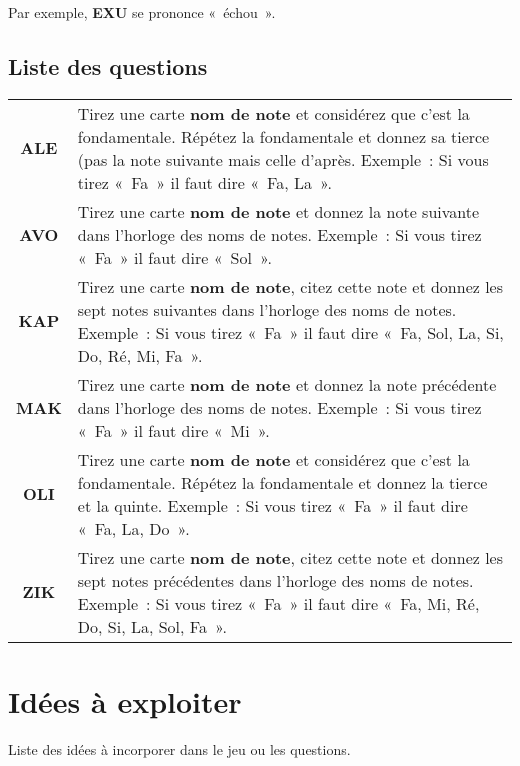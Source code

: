 \documentclass[11pt]{article}
\newcommand{\carte}[1]
{\textbf{#1}}
\newcommand{\QST}[1]
{\textbf{#1}}
\begin{document}
Par exemple, \QST{EXU} se prononce « échou ».

\subsection{Liste des questions} \label{liste questions}

\begin{tabular}{ c p{12cm} }
    \QST{ALE} & Tirez une carte \carte{nom de note} et considérez que c’est la
                fondamentale. Répétez la fondamentale et donnez sa tierce (pas
                la note suivante mais celle d’après. Exemple : Si vous tirez
                « Fa » il faut dire « Fa, La ». \\
    \QST{AVO} & Tirez une carte \carte{nom de note} et donnez la note suivante
                dans l’horloge des noms de notes. Exemple : Si vous tirez
                « Fa » il faut dire « Sol ». \\
    \QST{KAP} & Tirez une carte \carte{nom de note}, citez cette note et donnez
                les sept notes suivantes dans l’horloge des noms de notes.
                Exemple : Si vous tirez « Fa » il faut dire « Fa, Sol, La, Si,
                Do, Ré, Mi, Fa ». \\
    \QST{MAK} & Tirez une carte \carte{nom de note} et donnez la note
                précédente dans l’horloge des noms de notes. Exemple : Si vous
                tirez « Fa » il faut dire « Mi ». \\
    \QST{OLI} & Tirez une carte \carte{nom de note} et considérez que c’est la
                fondamentale. Répétez la fondamentale et donnez la tierce et
                la quinte. Exemple : Si vous tirez « Fa » il faut dire « Fa,
                La, Do ». \\
    \QST{ZIK} & Tirez une carte \carte{nom de note}, citez cette note et donnez
                les sept notes précédentes dans l’horloge des noms de notes.
                Exemple : Si vous tirez « Fa » il faut dire « Fa, Mi, Ré, Do,
                Si, La, Sol, Fa ».
\end{tabular}

\section{Idées à exploiter}

Liste des idées à incorporer dans le jeu ou les questions.
\end{document}
